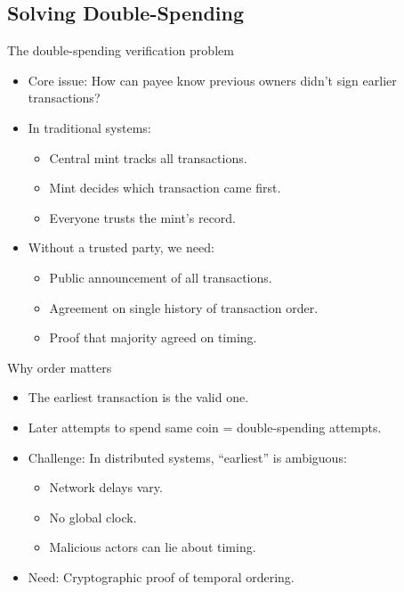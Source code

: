 \documentclass[aspectratio=169, lualatex, handout]{beamer}
\begin{document}
\subsection{Solving Double-Spending}

\begin{frame}{The double-spending verification problem}
	\begin{itemize}
		\item Core issue: How can payee know previous owners didn't sign earlier transactions?
		\item In traditional systems:
		      \begin{itemize}
			      \item Central mint tracks all transactions.
			      \item Mint decides which transaction came first.
			      \item Everyone trusts the mint's record.
		      \end{itemize}
		\item Without a trusted party, we need:
		      \begin{itemize}
			      \item Public announcement of all transactions.
			      \item Agreement on single history of transaction order.
			      \item Proof that majority agreed on timing.
		      \end{itemize}
	\end{itemize}
\end{frame}

\begin{frame}{Why order matters}
	\begin{itemize}
		\item The earliest transaction is the valid one.
		\item Later attempts to spend same coin = double-spending attempts.
		\item Challenge: In distributed systems, ``earliest'' is ambiguous:
		      \begin{itemize}
			      \item Network delays vary.
			      \item No global clock.
			      \item Malicious actors can lie about timing.
		      \end{itemize}
		\item Need: Cryptographic proof of temporal ordering.
	\end{itemize}
\end{frame}
\end{document}
